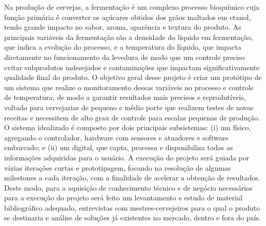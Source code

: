 Na produção de cervejas, a fermentação é um complexo processo bioquímico cuja função primária é converter os açúcares obtidos dos grãos maltados em etanol, tendo grande impacto no sabor, aroma, aparência e textura do produto. 
As principais variáveis da fermentação são a densidade do líquido em fermentação, que indica a evolução do processo, e a temperatura do líquido, que impacta diretamente no funcionamento da levedura de modo que um controle preciso evitar subprodutos indesejados e contaminações que impactam significativamente qualidade final do produto. 
O objetivo geral desse projeto é criar um protótipo de um sistema que realize o monitoramento dessas variáveis no processo e controle de temperatura, de modo a garantir resultados mais precisos e reprodutíveis, voltado para cervejarias de pequeno e médio porte que realizem testes de novas receitas e necessitem de alto grau de controle para escalas pequenas de produção. 
O sistema idealizado é composto por dois principais subsistemas: (i) um físico, agregando o controlador, hardware com sensores e atuadores e software embarcado; e (ii) um digital, que capta, processa e disponibiliza todas as informações adquiridas para o usuário. A execução do projeto será guiada por várias iterações curtas e prototipagem, focando na resolução de algumas milestones a cada iteração, com a finalidade de acelerar a obtenção de resultados.
Deste modo, para a aquisição de conhecimento técnico e de negócio necessários para a execução do projeto será feito um levantamento e estudo de material bibliográfico adequado, entrevistas com mestres-cervejeiros para o qual o produto se destinaria e análise de soluções já existentes no mercado, dentro e fora do país.
